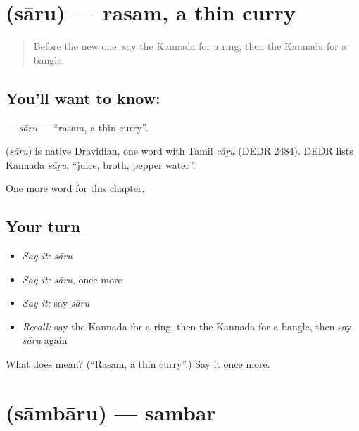 \section[\texorpdfstring{\kn{ಸಾರು} (sāru)}{ಸಾರು (sāru)}]{ (sāru) — rasam, a thin curry}

\label{lesson:KA-C121-saru}



\begin{quote}
Before the new one: say the Kannada for a ring, then the Kannada for a bangle.
\end{quote}

\subsection*{You'll want to know: }
\textbf{} — \emph{sāru} — \textquotedblleft{}rasam, a thin curry\textquotedblright{}.

\begin{cousinweb}
\textbf{} (\emph{sāru}) is native Dravidian, one word with Tamil \emph{cāṟu} (DEDR 2484). DEDR lists Kannada \emph{sāṟu}, \textquotedblleft{}juice, broth, pepper water\textquotedblright{}.
\end{cousinweb}

\begin{grammarlens}[title={What you've built}]
One more word for this chapter.
\end{grammarlens}

\subsection*{Your turn}
\begin{itemize}
\raggedright
  \item \emph{Say it:} \emph{sāru}
  \item \emph{Say it:} \emph{sāru}, once more
  \item \emph{Say it:} say \emph{sāru}
  \item \emph{Recall:} say the Kannada for a ring, then the Kannada for a bangle, then say \emph{sāru} again
\end{itemize}

\begin{tcolorbox}[breakable,colback=teal!4,colframe=teal!35!black,title={Before you move on}]
What does  mean? (\textquotedblleft{}Rasam, a thin curry\textquotedblright{}.) Say it once more.
\end{tcolorbox}
\section[\texorpdfstring{\kn{ಸಾಂಬಾರು} (sāmbāru)}{ಸಾಂಬಾರು (sāmbāru)}]{ (sāmbāru) — sambar}


